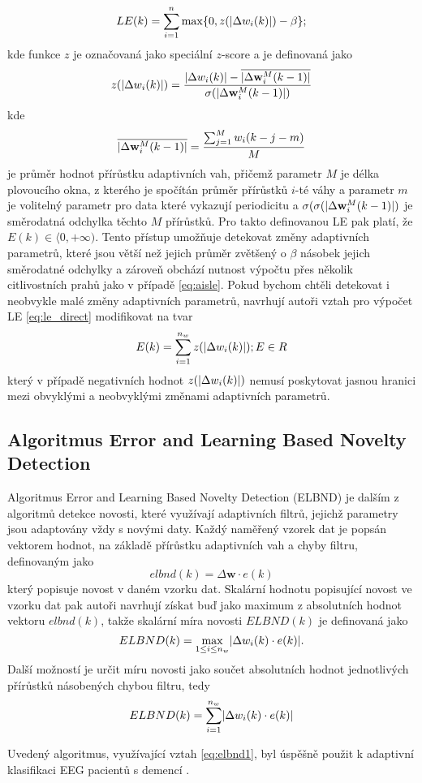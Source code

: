\begin{equation}\label{eq:le_direct}
LE(k)=\sum_{i=1}^n \max \{0,z(\lvert\Delta w_i(k)\rvert)-\beta \};
\end{equation}
kde funkce $z$ je označovaná jako speciální $z$-score a je definovaná jako
\begin{equation}
z(\lvert\Delta w_i(k)\rvert) = \frac{\lvert\Delta w_i(k)\rvert-\overline{\lvert\Delta\textbf{w}_i^M(k-1)\rvert}}{\sigma(\lvert\Delta \textbf{w}_i^M(k-1)\rvert)}
\end{equation}
kde
\begin{equation}
\overline{\lvert\Delta \textbf{w}_i^M(k-1)\rvert}=\frac{\sum_{j=1}^M w_i(k-j-m)}{M}
\end{equation} 
je průměr hodnot přírůstku adaptivních vah, přičemž parametr $M$ je délka plovoucího okna, z kterého je spočítán průměr přírůstků $i$-té váhy a parametr $m$ je volitelný parametr pro data které vykazují periodicitu a $\sigma(\sigma(\lvert\Delta \textbf{w}_i^M(k-1)\rvert)$ je směrodatná odchylka těchto $M$ přírůstků. Pro takto definovanou LE pak platí, že $E(k)\in \langle0,+\infty)$. Tento přístup umožňuje detekovat změny adaptivních parametrů, které jsou větší než jejich průměr zvětšený o $\beta$ násobek jejich směrodatné odchylky a zároveň obchází nutnost výpočtu přes několik citlivostních prahů jako v případě \ref{eq:aisle}. Pokud bychom chtěli detekovat i neobvykle malé změny adaptivních parametrů, navrhují autoři vztah pro výpočet LE \ref{eq:le_direct} modifikovat na tvar
\begin{equation}\label{eq:le_direct_padasip}
E(k)=\sum_{i=1}^{n_w}z(\lvert\Delta w_i(k)\rvert); E \in R
\end{equation}
který v případě negativních hodnot $z(\lvert\Delta w_i(k)\rvert)$ nemusí poskytovat jasnou hranici mezi obvyklými a neobvyklými změnami adaptivních parametrů.
\subsection{Algoritmus Error and Learning Based Novelty Detection}\label{chap:elbnd}
Algoritmus Error and Learning Based Novelty Detection (ELBND) \cite{elbnd1,elbnd2} je dalším z algoritmů detekce novosti, které využívají adaptivních filtrů, jejichž parametry jsou adaptovány vždy s novými daty. Každý naměřený vzorek dat je popsán vektorem hodnot, na základě přírůstku adaptivních vah a chyby filtru, definovaným jako
\begin{equation}
	elbnd(k)=\Delta\textbf{w}\cdot e(k)
\end{equation}
který popisuje novost v daném vzorku dat. Skalární hodnotu popisující novost ve vzorku dat pak autoři navrhují získat buď jako maximum z absolutních hodnot vektoru $elbnd(k)$, takže skalární míra novosti $ELBND(k)$ je definovaná jako
\begin{equation}\label{eq:elbnd1}
ELBND(k) = \max_{1\leq i \leq n_w} \lvert\Delta w_i(k) \cdot e(k)\rvert.
\end{equation}
Další možností je určit míru novosti jako součet absolutních hodnot jednotlivých přírůstků násobených chybou filtru, tedy
\begin{equation}\label{eq:elbnd2}
	ELBND(k)=\sum_{i=1}^{n_w}\lvert\Delta w_i(k)\cdot e(k)\rvert
\end{equation}

Uvedený algoritmus, využívající vztah \ref{eq:elbnd1}, byl úspěšně použit k adaptivní klasifikaci EEG pacientů s demencí \cite{elbnd3}.

